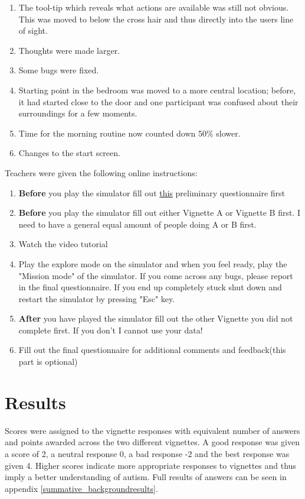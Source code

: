 \documentclass[11pt]{report}
\begin{document}
\begin{enumerate}
\item The tool-tip which reveals what actions are available was still not obvious. This was moved to below the cross hair and thus directly into the users line of sight.
\item Thoughts were made larger.
\item Some bugs were fixed. 
\item Starting point in the bedroom was moved to a more central location; before, it had started close to the door and one participant was confused about their surroundings for a few moments.
\item Time for the morning routine now counted down 50\% slower.
\item Changes to the start screen.
\end{enumerate}

Teachers were given the following online instructions:

\begin{enumerate}
\item \textbf{Before} you play the simulator fill out \underline{this} preliminary questionnaire first
\item \textbf{Before} you play the simulator fill out either Vignette A or Vignette B first. I need to have a general equal amount of people doing A or B first.
\item Watch the video tutorial
\item Play the explore mode on the simulator and when you feel ready, play the "Mission mode" of the simulator. If you come across any bugs, please report in the final questionnaire. If you end up completely stuck shut down and restart the simulator by pressing "Esc" key.
\item \textbf{After} you have played the simulator fill out the other Vignette you did not complete first. If you don't I cannot use your data!
\item Fill out the final questionnaire for additional comments and feedback(this part is optional)
\end{enumerate}

\section{Results}

Scores were assigned to the vignette responses with equivalent number of answers and points awarded across the two different vignettes. A good response was given a score of 2, a neutral response 0, a bad response -2 and the best response was given 4. Higher scores indicate more appropriate responses to vignettes and thus imply a better understanding of autism. Full results of answers can be seen in appendix \ref{summative_backgroundresults}. 
\end{document}
